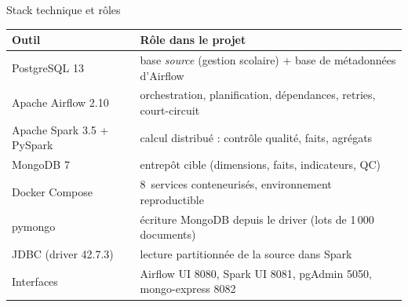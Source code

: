 \documentclass[10pt]{beamer}
\begin{document}
\begin{frame}{Stack technique et rôles}
  \scriptsize
  \begin{tabular}{@{}ll@{}}
    \toprule
    \textbf{Outil} & \textbf{Rôle dans le projet} \\
    \midrule
    PostgreSQL 13 & base \emph{source} (gestion scolaire) + base de métadonnées d'Airflow \\
    Apache Airflow 2.10 & orchestration, planification, dépendances, retries, court-circuit \\
    Apache Spark 3.5 + PySpark & calcul distribué : contrôle qualité, faits, agrégats \\
    MongoDB 7 & entrepôt cible (dimensions, faits, indicateurs, QC) \\
    Docker Compose & 8~services conteneurisés, environnement reproductible \\
    pymongo & écriture MongoDB depuis le driver (lots de 1\,000 documents) \\
    JDBC (driver 42.7.3) & lecture partitionnée de la source dans Spark \\
    Interfaces & Airflow UI 8080, Spark UI 8081, pgAdmin 5050, mongo-express 8082 \\
    \bottomrule
  \end{tabular}
\end{frame}
\end{document}
